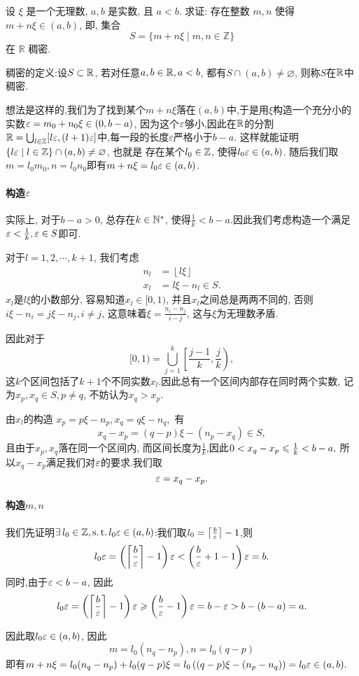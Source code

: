 \begin{exercise}[1.C.16]
    设 $\xi$ 是一个无理数,  $a, b$ 是实数,  且 $a<b$. 求证: 存在整数 $m, n$ 使得 $m+n\xi \in (a, b)$,  即,  集合
    $$ S = \{m+n\xi \mid m,  n \in \mathbb{Z}\} $$
    在 $\mathbb{R}$ 稠密.
\end{exercise}
\begin{solution}
    稠密的定义:设$S\subset \mathbb{R}$, 若对任意$a, b\in\mathbb{R}, a<b$, 都有$S\cap(a, b)\neq\varnothing$, 则称$S$在$\mathbb{R}$中稠密.

    想法是这样的,我们为了找到某个$m+n\xi$落在$(a, b)$中,于是用$\xi$构造一个充分小的实数$\varepsilon = m_0 + n_0 \xi \in \left( 0, {b-a} \right)$, 因为这个$\varepsilon$够小,因此在$\mathbb{R}$的分割$\mathbb{R}=\bigcup_{l\in\mathbb{Z}}[l\varepsilon, (l+1)\varepsilon]$中,每一段的长度$\varepsilon$严格小于$b-a$.
    这样就能证明$\{l \varepsilon \mid l\in\mathbb{Z}\} \cap (a, b) \neq \varnothing$, 也就是
    存在某个$l_0\in\mathbb{Z}$, 使得$l_0\varepsilon\in(a, b)$.
    随后我们取$m=l_0m_0, n=l_0n_0$即有$m+n\xi=l_0\varepsilon\in(a, b)$.

    \paragraph*{构造$\varepsilon$}

    实际上, 对于$b-a>0$, 总存在$k\in\mathbb{N}^*$, 使得$\frac{1}{k}<{b-a}$.因此我们考虑构造一个满足$\varepsilon<\frac{1}{k}, \varepsilon\in S$即可.

    对于$l=1, 2, \cdots, k+1$, 我们考虑
    \begin{align*}
        n_l & =\left\lfloor l\xi \right\rfloor \\
        x_l & =l\xi-n_l \in S.
    \end{align*}
    $x_l$是$l\xi$的小数部分, 容易知道$x_l\in[0, 1)$, 并且$x_l$之间总是两两不同的, 否则$i\xi-n_i=j\xi-n_j, i\neq j$, 这意味着$\xi=\frac{n_i-n_j}{i-j}$, 这与$\xi$为无理数矛盾.

    因此对于$$[0, 1)=\bigcup_{j=1}^{k} \left[ \frac{j-1}{k}, \frac{j}{k} \right), $$
    这$k$个区间包括了$k+1$个不同实数$x_l$.因此总有一个区间内部存在同时两个实数, 记为$x_p, x_q \in S, p\neq q$, 不妨认为$x_q>x_p$.

    由$x_l$的构造 $x_p=p\xi-n_p, x_q=q\xi-n_q,$
    有$$ x_q-x_p=(q-p)\xi-(n_p-x_q)\in S,$$
    且由于$x_p, x_q$落在同一个区间内, 而区间长度为$\frac{1}{k}$,因此$0<x_q-x_p\leqslant\frac{1}{k}< {b-a},$
    所以$x_q-x_p$满足我们对$\varepsilon$的要求.我们取$$\varepsilon=x_q-x_p.$$

    \paragraph*{构造$m, n$}

    我们先证明$\exists l_0\in\Z, \st l_0\ve\in(a, b)$:我们取$l_0 = \left\lceil \frac{b}{\varepsilon} \right\rceil - 1$,则$$l_0 \varepsilon = \left(\left\lceil \frac{b}{\varepsilon} \right\rceil - 1\right)\varepsilon < \left(\frac{b}{\varepsilon} + 1 - 1\right)\varepsilon = b.$$
    同时,由于$\varepsilon < {b-a}$, 因此$$l_0 \varepsilon = \left(\left\lceil \frac{b}{\varepsilon} \right\rceil - 1\right)\varepsilon \geqslant \left(\frac{b}{\varepsilon} - 1\right)\varepsilon = b - \varepsilon > b - (b-a) = a.$$

    因此取$l_0\varepsilon\in(a, b)$, 因此$$m=l_0(n_q-n_p), n=l_0(q-p)$$
    即有$m+n\xi=l_0 (n_q-n_p)+l_0(q-p)\xi=l_0 \left( (q-p)\xi-(n_p-n_q) \right)=l_0\varepsilon\in(a, b).$
\end{solution}


